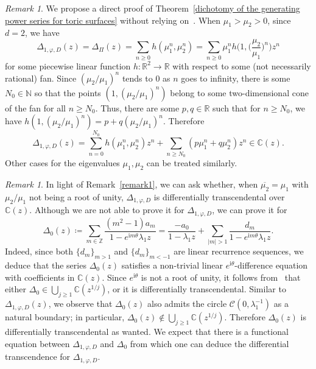 \documentclass[11pt,a4paper]{article}
\theoremstyle{plain}
\theoremstyle{remark}
\newtheorem{remark}[theorem]{Remark}
\theoremstyle{custombold}
\newcommand{\irm}{\mathrm{i}}
\begin{document}
\begin{remark}
    We propose a direct proof of Theorem~\ref{dichotomy of the generating power series for toric surfaces} without relying on~\cite{Favre-2003}. When $\mu_1>\mu_2>0$, since $d=2$, we have
    $$\Delta_{1,\varphi,D}(z)=\Delta_\Pi(z)=\sum_{n\geq0}h(\mu_1^n,\mu_2^n)=\sum_{n\geq0}\mu_1^nh\Big(1,\Big(\frac{\mu_2}{\mu_1}\Big)^n\Big)z^n$$ for some piecewise linear function $h\colon \mathbb R^2\rightarrow\mathbb R$ with respect to some (not necessarily rational) fan. Since $(\mu_{2}/\mu_1)^n$ tends to 0 as $n$ goes to infinity, there is some $N_0\in\mathbb N$ so that the points $(1,({\mu_2}/{\mu_1})^n)$ belong to some two-dimensional cone of the fan for all $n\geq N_0$. Thus, 
    there are some $p,q\in\mathbb R$ such that for $n\geq N_0$, we have  $h(1, (\mu_2/\mu_1)^n)=p+q(\mu_2/\mu_1)^n.$
    Therefore  $$\Delta_{1,\varphi,D}(z)=\sum_{n=0}^{N_0}h(\mu_1^n,\mu_2^n)z^n+\sum_{n\geq N_0}(p\mu_1^n+q\mu_2^n)z^n\in\mathbb C(z).$$
    Other cases for the eigenvalues $\mu_1,\mu_2$ can be treated similarly.
\end{remark}

\begin{remark}
In light of Remark~\ref{remark1}, we can ask whether, when $\overline{\mu_2}=\mu_1$ with $\mu_2/\mu_1$ not being a root of unity,  $\Delta_{1,\varphi,D}$ is differentially transcendental over $\mathbb C(z)$. Although we are not able to prove it for $\Delta_{1,\varphi,D}$, we can prove it for $$\Delta_0(z)\coloneqq \sum_{m\in\mathbb Z}\frac{(m^2-1)a_m}{1-e^{\irm m\theta}\lambda_1z}=\frac{-a_{0}}{1-\lambda_1z}+\sum_{|m|>1}\frac{d_m}{1-e^{\irm m\theta}\lambda_1z}.$$
Indeed, since both $\{d_m\}_{m>1}$ and $\{d_m\}_{m<-1}$ are linear recurrence sequences, we deduce that the series $\Delta_0(z)$ satisfies a non-trivial linear $e^{\irm\theta}$-difference equation with coefficients in $\mathbb C(z)$. Since $e^{\irm\theta}$ is not a root of unity, it follows from~\cite[Theorem~1.2]{Adamczewski-Dreyfus-Hardouin-2021} that either $\Delta_0\in \bigcup_{j\geq1}\mathbb C(z^{1/j})$, or it is differentially transcendental. Similar to $\Delta_{1,\varphi,D}(z)$, we observe that $\Delta_0(z)$ also admits the circle $\mathcal{C}(0,\lambda_1^{-1})$ as a natural boundary; in particular, $\Delta_0(z)\not\in \bigcup_{j\geq1}\mathbb C(z^{1/j})$. Therefore $\Delta_0(z)$ is differentially transcendental as wanted. We expect that there is a functional equation between $\Delta_{1,\varphi,D}$ and $\Delta_0$ from which one can deduce the differential transcendence for $\Delta_{1,\varphi,D}$. 
\end{remark}
\end{document}
